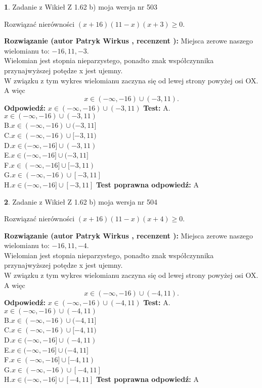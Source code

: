 \documentclass[12pt, a4paper]{article}
\theoremstyle{definition} %
\newtheorem{zad}{}
\newcommand{\zadStart}[1]{\begin{zad}#1\newline}
\newcommand{\zadStop}{\end{zad}}
\newcommand{\rozwStart}[2]{\noindent \textbf{Rozwiązanie (autor #1 , recenzent #2): }\newline}
\newcommand{\rozwStop}{\newline}
\newcommand{\odpStart}{\noindent \textbf{Odpowiedź:}\newline}
\newcommand{\odpStop}{\newline}
\newcommand{\testStart}{\noindent \textbf{Test:}\newline}
\newcommand{\testStop}{\newline}
\newcommand{\kluczStart}{\noindent \textbf{Test poprawna odpowiedź:}\newline}
\newcommand{\kluczStop}{\newline}
\begin{document}
\zadStart{Zadanie z Wikieł Z 1.62 b) moja wersja nr 503}

Rozwiązać nierówności $(x+16)(11-x)(x+3)\ge0$.
\zadStop
\rozwStart{Patryk Wirkus}{}
Miejsca zerowe naszego wielomianu to: $-16, 11, -3$.\\
Wielomian jest stopnia nieparzystego, ponadto znak współczynnika przy\linebreak najwyższej potędze x jest ujemny.\\ W związku z tym wykres wielomianu zaczyna się od lewej strony powyżej osi OX. A więc $$x \in (-\infty,-16) \cup (-3,11).$$
\rozwStop
\odpStart
$x \in (-\infty,-16) \cup (-3,11)$
\odpStop
\testStart
A.$x \in (-\infty,-16) \cup (-3,11)$\\
B.$x \in (-\infty,-16) \cup (-3,11]$\\
C.$x \in (-\infty,-16) \cup [-3,11)$\\
D.$x \in (-\infty,-16] \cup (-3,11)$\\
E.$x \in (-\infty,-16] \cup (-3,11]$\\
F.$x \in (-\infty,-16] \cup [-3,11)$\\
G.$x \in (-\infty,-16) \cup [-3,11]$\\
H.$x \in (-\infty,-16] \cup [-3,11]$
\testStop
\kluczStart
A
\kluczStop



\zadStart{Zadanie z Wikieł Z 1.62 b) moja wersja nr 504}

Rozwiązać nierówności $(x+16)(11-x)(x+4)\ge0$.
\zadStop
\rozwStart{Patryk Wirkus}{}
Miejsca zerowe naszego wielomianu to: $-16, 11, -4$.\\
Wielomian jest stopnia nieparzystego, ponadto znak współczynnika przy\linebreak najwyższej potędze x jest ujemny.\\ W związku z tym wykres wielomianu zaczyna się od lewej strony powyżej osi OX. A więc $$x \in (-\infty,-16) \cup (-4,11).$$
\rozwStop
\odpStart
$x \in (-\infty,-16) \cup (-4,11)$
\odpStop
\testStart
A.$x \in (-\infty,-16) \cup (-4,11)$\\
B.$x \in (-\infty,-16) \cup (-4,11]$\\
C.$x \in (-\infty,-16) \cup [-4,11)$\\
D.$x \in (-\infty,-16] \cup (-4,11)$\\
E.$x \in (-\infty,-16] \cup (-4,11]$\\
F.$x \in (-\infty,-16] \cup [-4,11)$\\
G.$x \in (-\infty,-16) \cup [-4,11]$\\
H.$x \in (-\infty,-16] \cup [-4,11]$
\testStop
\kluczStart
A
\kluczStop
\end{document}
